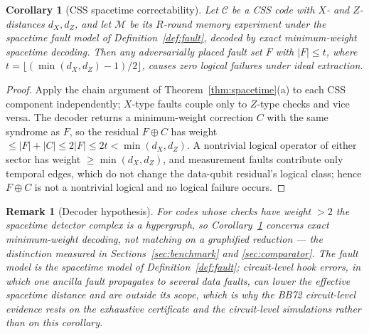 \documentclass[11pt,a4paper]{article}
\newtheorem{corollary}{Corollary}\newtheorem{proposition}{Proposition}
\newtheorem{remark}{Remark}
\begin{document}
\begin{corollary}[CSS spacetime correctability]\label{cor:css}
Let $\mathcal{C}$ be a CSS code with $X$- and $Z$-distances $d_X,d_Z$,
and let $\mathcal{M}$ be its $R$-round memory experiment under the
spacetime fault model of Definition~\ref{def:fault}, decoded by exact
minimum-weight spacetime decoding. Then any adversarially placed fault
set $F$ with $|F|\le t$, where
$t=\lfloor(\min(d_X,d_Z)-1)/2\rfloor$, causes zero logical failures
under ideal extraction.
\end{corollary}
\begin{proof}
Apply the chain argument of Theorem~\ref{thm:spacetime}(a) to each CSS
component independently; $X$-type faults couple only to $Z$-type
checks and vice versa. The decoder returns a minimum-weight correction
$C$ with the same syndrome as $F$, so the residual $F\oplus C$ has
weight $\le|F|+|C|\le2|F|\le2t<\min(d_X,d_Z)$. A nontrivial logical
operator of either sector has weight $\ge\min(d_X,d_Z)$, and
measurement faults contribute only temporal edges, which do not change
the data-qubit residual's logical class; hence $F\oplus C$ is not a
nontrivial logical and no logical failure occurs.
\end{proof}
\begin{remark}[Decoder hypothesis]\label{rem:css-scope}
For codes whose checks have weight $>2$ the spacetime detector complex
is a hypergraph, so Corollary~\ref{cor:css} concerns exact
minimum-weight decoding, not matching on a graphified reduction ---
the distinction measured in Sections~\ref{sec:benchmark} and
\ref{sec:comparator}. The fault model is the spacetime model of
Definition~\ref{def:fault}; circuit-level hook errors, in which one
ancilla fault propagates to several data faults, can lower the
effective spacetime distance and are outside its scope, which is why
the BB72 circuit-level evidence rests on the exhaustive certificate
and the circuit-level simulations rather than on this corollary.
\end{remark}
\end{document}
